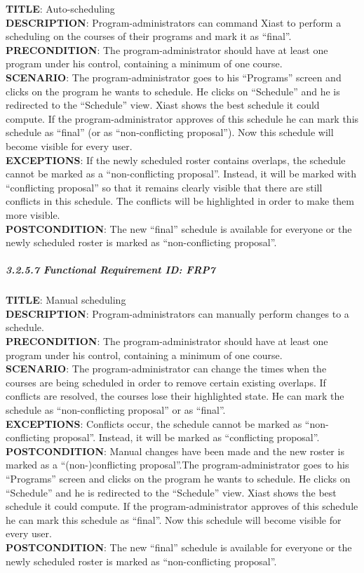 \documentclass[12pt]{article}
\begin{document}
\textbf{TITLE}: Auto-scheduling\\\textbf{DESCRIPTION}:
Program-administrators can command Xiast to perform a scheduling on the
courses of their programs and mark it as
``final''.\\\textbf{PRECONDITION}: The program-administrator should have
at least one program under his control, containing a minimum of one
course.\\\textbf{SCENARIO}: The program-administrator goes to his
``Programs'' screen and clicks on the program he wants to schedule. He
clicks on ``Schedule'' and he is redirected to the ``Schedule'' view.
Xiast shows the best schedule it could compute. If the
program-administrator approves of this schedule he can mark this
schedule as ``final'' (or as ``non-conflicting proposal''). Now this
schedule will become visible for every user.\\\textbf{EXCEPTIONS}: If
the newly scheduled roster contains overlaps, the schedule cannot be
marked as a ``non-conflicting proposal''. Instead, it will be marked
with ``conflicting proposal'' so that it remains clearly visible that
there are still conflicts in this schedule. The conflicts will be
highlighted in order to make them more visible.\\\textbf{POSTCONDITION}:
The new ``final'' schedule is available for everyone or the newly
scheduled roster is marked as ``non-conflicting proposal''.

\subparagraph{3.2.5.7 Functional Requirement \textbf{ID}:
FRP7\\}\label{functional-requirement-id-frp7}

\textbf{TITLE}: Manual scheduling\\\textbf{DESCRIPTION}:
Program-administrators can manually perform changes to a
schedule.\\\textbf{PRECONDITION}: The program-administrator should have
at least one program under his control, containing a minimum of one
course.\\\textbf{SCENARIO}: The program-administrator can change the
times when the courses are being scheduled in order to remove certain
existing overlaps. If conflicts are resolved, the courses lose their
highlighted state. He can mark the schedule as ``non-conflicting
proposal'' or as ``final''.\\\textbf{EXCEPTIONS}: Conflicts occur, the
schedule cannot be marked as ``non-conflicting proposal''. Instead, it
will be marked as ``conflicting proposal''.\\\textbf{POSTCONDITION}:
Manual changes have been made and the new roster is marked as a
``(non-)conflicting proposal''.The program-administrator goes to his
``Programs'' screen and clicks on the program he wants to schedule. He
clicks on ``Schedule'' and he is redirected to the ``Schedule'' view.
Xiast shows the best schedule it could compute. If the
program-administrator approves of this schedule he can mark this
schedule as ``final''. Now this schedule will become visible for every
user.\\\textbf{POSTCONDITION}: The new ``final'' schedule is available
for everyone or the newly scheduled roster is marked as
``non-conflicting proposal''.
\end{document}

